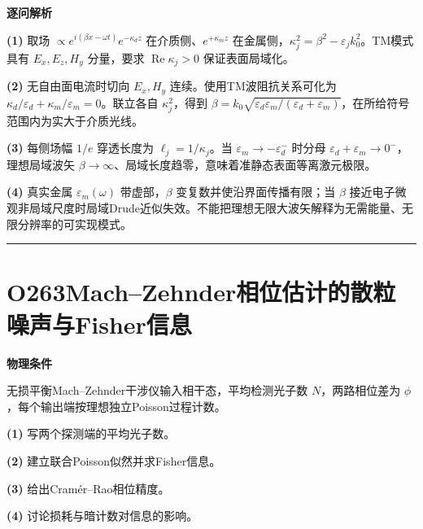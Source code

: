 \documentclass[UTF8,a4paper,11pt,oneside,openany]{ctexbook}
\begin{document}
\par\medskip\noindent\textbf{逐问解析}
\par\noindent\textbf{(1)} 取场 \(\propto e^{i(\beta x-\omega t)}e^{-\kappa_dz}\) 在介质侧、\(e^{+\kappa_mz}\) 在金属侧，\(\kappa_j^2=\beta^2-\varepsilon_jk_0^2\)。TM模式具有 \(E_x,E_z,H_y\) 分量，要求 \(\operatorname{Re}\kappa_j>0\) 保证表面局域化。
\par\noindent\textbf{(2)} 无自由面电流时切向 \(E_x,H_y\) 连续。使用TM波阻抗关系可化为 \(\kappa_d/\varepsilon_d+\kappa_m/\varepsilon_m=0\)。联立各自 \(\kappa_j^2\)，得到 \(\beta=k_0\sqrt{\varepsilon_d\varepsilon_m/(\varepsilon_d+\varepsilon_m)}\)，在所给符号范围内为实大于介质光线。
\par\noindent\textbf{(3)} 每侧场幅 \(1/e\) 穿透长度为 \(\ell_j=1/\kappa_j\)。当 \(\varepsilon_m\to-\varepsilon_d^-\) 时分母 \(\varepsilon_d+\varepsilon_m\to0^-\)，理想局域波矢 \(\beta\to\infty\)、局域长度趋零，意味着准静态表面等离激元极限。
\par\noindent\textbf{(4)} 真实金属 \(\varepsilon_m(\omega)\) 带虚部，\(\beta\) 变复数并使沿界面传播有限；当 \(\beta\) 接近电子微观非局域尺度时局域Drude近似失效。不能把理想无限大波矢解释为无需能量、无限分辨率的可实现模式。

\par\bigskip\hrule\bigskip
\section*{O263\quad Mach–Zehnder相位估计的散粒噪声与Fisher信息}
\textbf{物理条件}\par 无损平衡Mach–Zehnder干涉仪输入相干态，平均检测光子数 \(N\)，两路相位差为 \(\phi\)，每个输出端按理想独立Poisson过程计数。
\par\noindent\textbf{(1)} 写两个探测端的平均光子数。
\par\noindent\textbf{(2)} 建立联合Poisson似然并求Fisher信息。
\par\noindent\textbf{(3)} 给出Cramér–Rao相位精度。
\par\noindent\textbf{(4)} 讨论损耗与暗计数对信息的影响。
\end{document}
